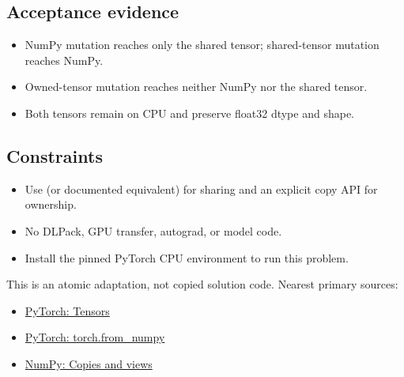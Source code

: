         \subsection{Acceptance evidence}

        \begin{evidencebox}
        \begin{itemize}
          \item NumPy mutation reaches only the shared tensor; shared-tensor mutation reaches NumPy.
  \item Owned-tensor mutation reaches neither NumPy nor the shared tensor.
  \item Both tensors remain on CPU and preserve float32 dtype and shape.
        \end{itemize}
        \end{evidencebox}

        \subsection{Constraints}

        \begin{itemize}
          \item Use  (or documented equivalent) for sharing and an explicit copy API for ownership.
  \item No DLPack, GPU transfer, autograd, or model code.
  \item Install the pinned PyTorch CPU environment to run this problem.
        \end{itemize}

        \begin{sourcebox}
        This is an atomic adaptation, not copied solution code. Nearest primary sources:
        \begin{itemize}
          \item \href{https://docs.pytorch.org/tutorials/beginner/basics/tensorqs_tutorial.html}{PyTorch: Tensors}
  \item \href{https://docs.pytorch.org/docs/stable/generated/torch.from_numpy.html}{PyTorch: torch.from\_numpy}
  \item \href{https://numpy.org/doc/stable/user/basics.copies.html}{NumPy: Copies and views}
        \end{itemize}
        \end{sourcebox}
